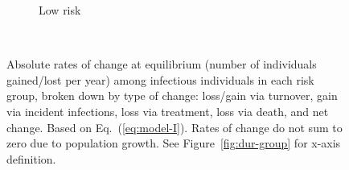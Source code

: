 \begin{figure}
\begin{minipage}[t]{0.475\linewidth}
\begin{subfigure}{0.85\linewidth}
    \caption{Low risk}
    \label{fig:dX-I-low}
  \end{subfigure}\\
  \caption{Absolute rates of change at equilibrium
    (number of individuals gained/lost per year)
    among infectious individuals in each risk group,
    broken down by type of change:
    loss/gain via turnover, %
    gain via incident infections, %
    loss via treatment, %
    loss via death, %
    and net change.
    Based on Eq.~(\ref{eq:model-I}).
    Rates of change do not sum to zero due to population growth.
    See Figure~\ref{fig:dur-group} for x-axis definition.}
  \label{fig:dX-I}
\end{minipage}
\end{figure}
